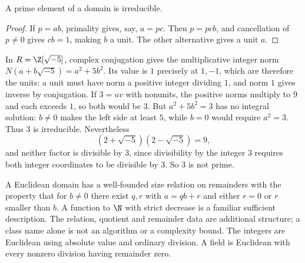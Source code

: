 \begin{proposition}\label{prop:prime-implies-irreducible}
A prime element of a domain is irreducible.
\end{proposition}
\begin{proof}
If $p=ab$, primality gives, say, $a=pc$. Then $p=pcb$, and
cancellation of $p\ne0$ gives $cb=1$, making $b$ a unit.
The other alternative gives a unit $a$.
\end{proof}

In $R=\Z[\sqrt{-5}]$, complex conjugation gives the multiplicative
integer norm $N(a+b\sqrt{-5})=a^2+5b^2$. Its value is $1$ precisely
at $1,-1$, which are therefore the units: a unit must have norm a
positive integer dividing $1$, and norm $1$ gives inverse by conjugation.
If $3=uv$ with nonunits, the positive norms multiply to $9$ and each
exceeds $1$, so both would be $3$. But $a^2+5b^2=3$ has no integral
solution: $b\ne0$ makes the left side at least $5$, while $b=0$ would
require $a^2=3$. Thus $3$ is irreducible. Nevertheless
\[
 (2+\sqrt{-5})(2-\sqrt{-5})=9,
\]
and neither factor is divisible by $3$, since divisibility by the
integer $3$ requires both integer coordinates to be divisible by $3$.
So $3$ is not prime.

A Euclidean domain has a well-founded size relation on remainders with
the property that for $b\ne0$ there exist $q,r$ with
$a=qb+r$ and either $r=0$ or $r$ smaller than $b$.
A function to $\N$ with strict decrease is a familiar sufficient
description. The relation, quotient and remainder data are additional
structure; a class name alone is not an algorithm or a complexity bound.
The integers are Euclidean using absolute value and ordinary division.
A field is Euclidean with every nonzero division having remainder zero.

